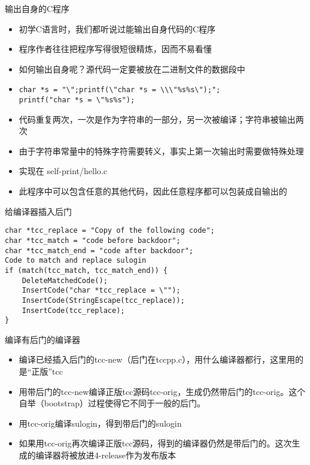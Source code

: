 \documentclass{beamer}
\begin{document}
\begin{frame}[fragile]{输出自身的C程序}
\begin{itemize}
  \item 初学C语言时，我们都听说过能输出自身代码的C程序
  \item 程序作者往往把程序写得很短很精炼，因而不易看懂
  \item 如何输出自身呢？源代码一定要被放在二进制文件的数据段中
  \item {
\begin{verbatim}
char *s = "\";printf(\"char *s = \\\"%s%s\");";
printf("char *s = \"%s%s");
\end{verbatim}
  }
  \item 代码重复两次，一次是作为字符串的一部分，另一次被编译；字符串被输出两次
  \item 由于字符串常量中的特殊字符需要转义，事实上第一次输出时需要做特殊处理
  \item 实现在 self-print/hello.c
  \item 此程序中可以包含任意的其他代码，因此任意程序都可以包装成自输出的
\end{itemize}
\end{frame}

\begin{frame}[fragile]{给编译器插入后门}
\begin{verbatim}
char *tcc_replace = "Copy of the following code";
char *tcc_match = "code before backdoor";
char *tcc_match_end = "code after backdoor";
Code to match and replace sulogin
if (match(tcc_match, tcc_match_end)) {
    DeleteMatchedCode();
    InsertCode("char *tcc_replace = \"");
    InsertCode(StringEscape(tcc_replace));
    InsertCode(tcc_replace);
}
\end{verbatim}
\end{frame}

\begin{frame}{编译有后门的编译器}
\begin{itemize}
  \item 编译已经插入后门的tcc-new（后门在tccpp.c），用什么编译器都行，这里用的是“正版”tcc
  \item 用带后门的tcc-new编译正版tcc源码tcc-orig，生成仍然带后门的tcc-orig。这个自举（bootstrap）过程使得它不同于一般的后门。
  \item 用tcc-orig编译sulogin，得到带后门的sulogin
  \item 如果用tcc-orig再次编译正版tcc源码，得到的编译器仍然是带后门的。这次生成的编译器将被放进4-release作为发布版本
\end{itemize}
\end{frame}
\end{document}
